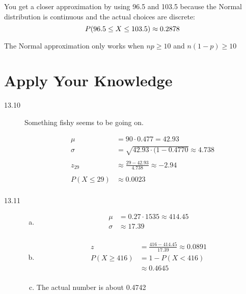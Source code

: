 \documentclass[landscape]{exam}
\begin{document}
  You get a closer approximation by using 96.5 and 103.5 because the Normal
  distribution is continuous and the actual choices are discrete:
  \[
    P(96.5 \leq X \leq 103.5) \approx 0.2878 \\
  \]

  The Normal approximation only works when $np \geq 10$ and $n(1 - p) \geq 10$

  \section{Apply Your Knowledge}
  \begin{description}
    \item[13.10]
      Something fishy seems to be going on.

      \begin{align*}
        \mu          & = 90 \cdot 0.477 = 42.93 \\
        \sigma       & = \sqrt{42.93 \cdot (1 - 0.4770} \approx 4.738 \\
        \\
        z_{29}       & \approx \frac{29 - 42.93}{4.738} \approx -2.94 \\
        \\
        P(X \leq 29) & \approx 0.0023 \\
      \end{align*}


    \item[13.11]
      \begin{enumerate}[(a)]
        \item 
          \begin{align*}
            \mu    & = 0.27 \cdot 1535 \approx 414.45 \\
            \sigma & \approx 17.39 \\
          \end{align*}

        \item
          \begin{align*}
            z             & = \frac{416 - 414.45}{17.39} \approx 0.0891 \\
            P(X \geq 416) & = 1 - P(X < 416) \\
                          & \approx 0.4645 \\
          \end{align*}

        \item The actual number is about 0.4742


\end{enumerate}
\end{description}
\end{document}
